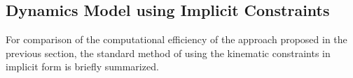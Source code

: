 \documentclass[twocolumn,10pt]{IFTOMM}
\begin{document}
%


\subsection{Dynamics Model using Implicit Constraints}
\label{sec:DynamicsImpl}

For comparison of the computational efficiency of the approach proposed in the previous section, the standard method \cite{NakamuraGho1989,ParkChoPlo1999,KhalilBen1995,SaminFis2013} of using the kinematic constraints in implicit form is briefly summarized.
\end{document}
